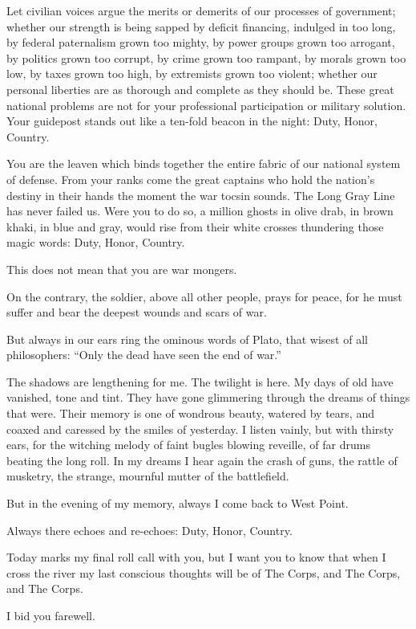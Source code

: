 \documentclass[a4paper]{amsbook}
\begin{document}
Let civilian voices argue the merits or demerits of our processes of government; whether our strength is being sapped by deficit financing, indulged in too long, by federal paternalism grown too mighty, by power groups grown too arrogant, by politics grown too corrupt, by crime grown too rampant, by morals grown too low, by taxes grown too high, by extremists grown too violent; whether our personal liberties are as thorough and complete as they should be. These great national problems are not for your professional participation or military solution. Your guidepost stands out like a ten-fold beacon in the night: Duty, Honor, Country.

You are the leaven which binds together the entire fabric of our national system of defense. From your ranks come the great captains who hold the nation's destiny in their hands the moment the war tocsin sounds. The Long Gray Line has never failed us. Were you to do so, a million ghosts in olive drab, in brown khaki, in blue and gray, would rise from their white crosses thundering those magic words: Duty, Honor, Country.

This does not mean that you are war mongers.

On the contrary, the soldier, above all other people, prays for peace, for he must suffer and bear the deepest wounds and scars of war.

But always in our ears ring the ominous words of Plato, that wisest of all philosophers: “Only the dead have seen the end of war.”

The shadows are lengthening for me. The twilight is here. My days of old have vanished, tone and tint. They have gone glimmering through the dreams of things that were. Their memory is one of wondrous beauty, watered by tears, and coaxed and caressed by the smiles of yesterday. I listen vainly, but with thirsty ears, for the witching melody of faint bugles blowing reveille, of far drums beating the long roll. In my dreams I hear again the crash of guns, the rattle of musketry, the strange, mournful mutter of the battlefield.

But in the evening of my memory, always I come back to West Point.

Always there echoes and re-echoes: Duty, Honor, Country.

Today marks my final roll call with you, but I want you to know that when I cross the river my last conscious thoughts will be of The Corps, and The Corps, and The Corps.

I bid you farewell.
\end{document}

